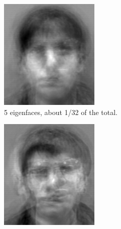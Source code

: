 \begin{figure}

\begin{subfigure}[b]{0.3\textwidth}
\includegraphics[width=\textwidth]{rebuiltThirtySecond.png}
\caption{5 eigenfaces, about 1/32 of the total.}
\label{fig:5_efaces}
\end{subfigure}
\begin{subfigure}[b]{0.3\textwidth}
\includegraphics[width=\textwidth]{rebuiltSixteenth.png}

\end{subfigure}
\end{figure}
